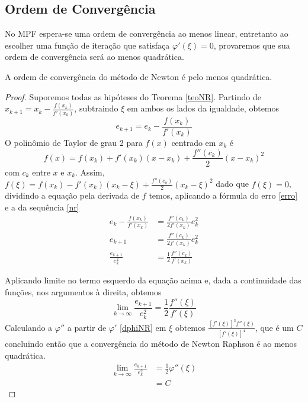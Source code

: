 \subsection{Ordem de Convergência}
No MPF espera-se uma ordem de convergência ao menos linear, entretanto ao escolher uma função de iteração que satisfaça $\varphi'(\xi) = 0$, provaremos que sua ordem de convergência será ao menos quadrática.
\begin{prop}
    A ordem de convergência do método de Newton é pelo menos quadrática.
\end{prop}
\begin{proof}
    Suporemos todas as hipóteses do Teorema \ref{teoNR}. %
    Partindo de $x_{k+1} = x_k - \frac{f(x_k)}{f'(x_k)}$, subtraindo $\xi$ em ambos os lados da igualdade, obtemos
\begin{equation} \label{eMNR}
    e_{k+1} = e_k - \frac{f(x_k)}{f'(x_k)} 
\end{equation}
O polinômio de Taylor de grau 2 para $f(x)$ centrado em $x_k$ é
\begin{equation*}
    f(x) = f(x_k) + f'(x_k)(x - x_k) + \frac{f''(c_k)}{2}(x-x_k)^2
\end{equation*}
com $c_k$ entre $x$ e $x_k$.
Assim, $f(\xi) = f(x_k) - f'(x_k)(x_k - \xi) + \frac{f''(c_k)}{2}(x_k-\xi)^2$ dado que $f(\xi) = 0$, dividindo a equação pela derivada de $f$ temos, aplicando a fórmula do erro \ref{erro} e a da sequência \ref{nr}
\begin{align*}
    e_k - \frac{f(x_k)}{f'(x_k)} &= \frac{f''(c_k)}{2f'(x_k)}e_k^2 \\
    e_{k+1} &= \frac{f''(c_k)}{2f'(x_k)}e_k^2 \\
    \frac{e_{k+1}}{e_k^2} &= \frac{1}{2} \frac{f''(c_k)}{f'(x_k)}
\end{align*}

Aplicando limite no termo esquerdo da equação acima e, dada a continuidade das funções, nos argumentos à direita, obtemos 
\begin{equation*}
    \lim_{k \to \infty} \frac{e_{k+1}}{e_k^2} = \frac{1}{2} \frac{f''(\xi)}{f'(\xi)}
\end{equation*}
Calculando a $\varphi''$ a partir de $\varphi'$ \ref{dphiNR} %
em $\xi$ obtemos $\frac{[f'(\xi)]^3f''(\xi)}{[f'(\xi)]^4}$, que é um $C$ concluindo então que a convergência do método de Newton Raphson é ao menos quadrática.
\begin{align*}
    \lim_{k \to \infty} \frac{e_{k+1}}{e_k^2} &= \frac{1}{2} \varphi''(\xi) \\
    &= C
\end{align*}
\end{proof}
